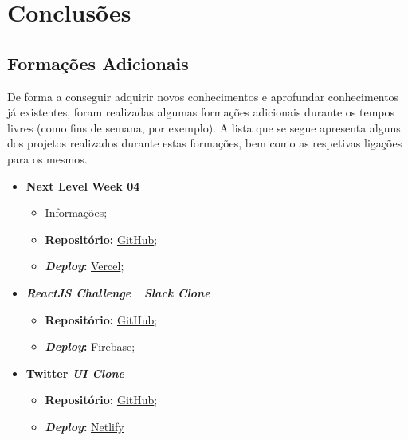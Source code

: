 \chapter{Conclusões}


\section{Formações Adicionais}

De forma a conseguir adquirir novos conhecimentos e aprofundar conhecimentos já existentes, foram realizadas algumas formações adicionais durante os tempos livres (como fins de semana, por exemplo). A lista que se segue apresenta alguns dos projetos realizados durante estas formações, bem como as respetivas ligações para os mesmos.


\begin{minipage}[t]{0.45\textwidth}
	\begin{itemize}
		\item \textbf{Next Level Week 04}
			\begin{itemize}
				\item \href{http://nextlevelweek.com/}{Informações};
				\item \textbf{Repositório:} \href{https://github.com/TutoDS/nlw04-react}{GitHub};
				\item \textbf{\textit{Deploy}:} \href{https://move-it-tutods.vercel.app}{Vercel};
			\end{itemize}

		\item \textbf{\textit{ReactJS Challenge~\textemdash~Slack Clone}}
			\begin{itemize}
				\item \textbf{Repositório:} \href{https://github.com/TutoDS/reactjs-slack-clone-challenge}{GitHub};
				\item \textbf{\textit{Deploy}:} \href{https://slack-clone-challenge-c35ca.web.app/}{Firebase};
			\end{itemize}

		\item \textbf{Twitter \textit{UI Clone}}
			\begin{itemize}
				\item \textbf{Repositório:} \href{https://github.com/TutoDS/twitter-ui-clone}{GitHub};
				\item \textbf{\textit{Deploy}:} \href{https://twitter-clone-tutods.netlify.app/}{Netlify}
			\end{itemize}
	\end{itemize}
\end{minipage}
